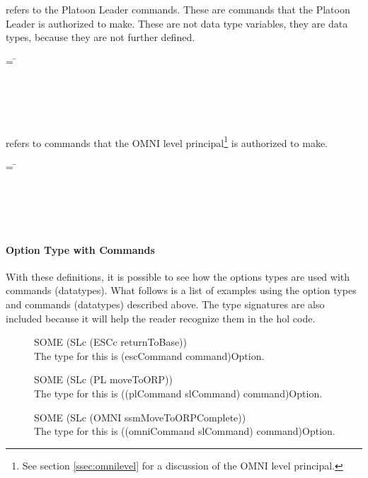 \documentclass[../../main/main.tex]{subfiles}
\begin{document}
 refers to the Platoon Leader commands.  These are commands that the Platoon Leader is authorized to make.  These are not data type variables, they are data types, because they are not further defined.

\begin{tabbing}
 = \=  \\
					     \>\HOLTokenBar{}  \\
					     \>\HOLTokenBar{}  \\
					     \>\HOLTokenBar{} \\
         				     \> \HOLTokenBar{}  \\
				             \> \HOLTokenBar{} 
\end{tabbing}


 refers to commands that the OMNI level principal\footnote{See section \ref{ssec:omnilevel} for a discussion of the OMNI level principal.} is authorized to make. 

\begin{tabbing}
 = \=  \\
						 \> \HOLTokenBar{} \\
 				       	 	 \> \HOLTokenBar{}  \\
						 \> \HOLTokenBar{} \\
            					 \> \HOLTokenBar{} \\
					 	 \> \HOLTokenBar{} 
\end{tabbing}          
          
          
\paragraph*{Option Type with Commands}
With these definitions, it is possible to see how the options types are used with commands (datatypes).  What follows is a list of examples using the option types and commands (datatypes) described above.  The type signatures are also included because it will help the reader recognize them in the \gls{hol} code.
\begin{description}
\item[ ] SOME (SLc (ESCc returnToBase)) \\
The type for this is (escCommand command)Option.
\item[ ] SOME (SLc (PL moveToORP))  \\
The type for this is ((plCommand slCommand) command)Option.  
\item[ ] SOME (SLc (OMNI ssmMoveToORPComplete))\\
The type for this is ((omniCommand slCommand) command)Option.  
\end{description}
\end{document}
